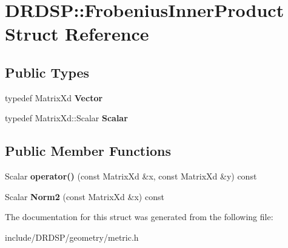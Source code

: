 \hypertarget{struct_d_r_d_s_p_1_1_frobenius_inner_product}{\section{D\-R\-D\-S\-P\-:\-:Frobenius\-Inner\-Product Struct Reference}
\label{struct_d_r_d_s_p_1_1_frobenius_inner_product}
}
\subsection*{Public Types}
\begin{DoxyCompactItemize}
\item 
\hypertarget{struct_d_r_d_s_p_1_1_frobenius_inner_product_aa8f7534db31acdcb6b8210af9cfa792c}{typedef Matrix\-Xd {\bfseries Vector}}\label{struct_d_r_d_s_p_1_1_frobenius_inner_product_aa8f7534db31acdcb6b8210af9cfa792c}

\item 
\hypertarget{struct_d_r_d_s_p_1_1_frobenius_inner_product_ac9b9c4144d29ddc883b4a8974c9189a7}{typedef Matrix\-Xd\-::\-Scalar {\bfseries Scalar}}\label{struct_d_r_d_s_p_1_1_frobenius_inner_product_ac9b9c4144d29ddc883b4a8974c9189a7}

\end{DoxyCompactItemize}
\subsection*{Public Member Functions}
\begin{DoxyCompactItemize}
\item 
\hypertarget{struct_d_r_d_s_p_1_1_frobenius_inner_product_adeedc7395fa902d0765c89bc98fe9e2a}{Scalar {\bfseries operator()} (const Matrix\-Xd \&x, const Matrix\-Xd \&y) const }\label{struct_d_r_d_s_p_1_1_frobenius_inner_product_adeedc7395fa902d0765c89bc98fe9e2a}

\item 
\hypertarget{struct_d_r_d_s_p_1_1_frobenius_inner_product_a506def98e9a9a220e78ee2bef3e8e68c}{Scalar {\bfseries Norm2} (const Matrix\-Xd \&x) const }\label{struct_d_r_d_s_p_1_1_frobenius_inner_product_a506def98e9a9a220e78ee2bef3e8e68c}

\end{DoxyCompactItemize}


The documentation for this struct was generated from the following file\-:\begin{DoxyCompactItemize}
\item 
include/\-D\-R\-D\-S\-P/geometry/metric.\-h\end{DoxyCompactItemize}
